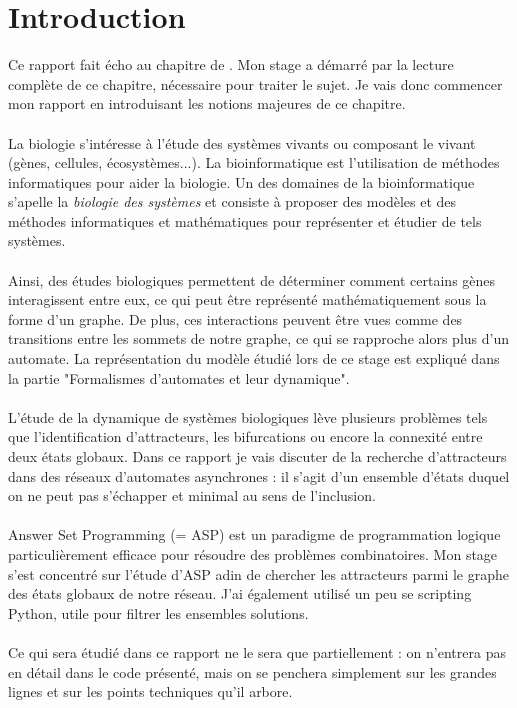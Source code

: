 \documentclass[12pt,a4paper]{article}
\begin{document}
\section{Introduction}
Ce rapport fait écho au chapitre de \cite{chapitre}. Mon stage a démarré par la lecture complète de ce chapitre, nécessaire pour traiter le sujet.
Je vais donc commencer mon rapport en introduisant les notions majeures de ce chapitre.\\ \\
La biologie s'intéresse à l'étude des systèmes vivants ou composant le vivant (gènes, cellules, écosystèmes...). La bioinformatique est l'utilisation de méthodes informatiques pour aider la biologie. Un des domaines de la 
bioinformatique s'apelle la \emph{biologie des systèmes} et consiste à proposer des modèles et des méthodes informatiques et mathématiques pour représenter et étudier de tels systèmes.\\ \\
Ainsi, des études biologiques permettent de déterminer comment certains gènes interagissent entre eux, ce qui peut être représenté mathématiquement sous la forme d'un graphe. De plus, ces interactions peuvent être vues comme des 
transitions entre les sommets de notre graphe, ce qui se rapproche alors plus d'un automate. La représentation du modèle étudié lors de ce stage est expliqué dans la partie "Formalismes d'automates et leur dynamique".\\ \\
L'étude de la dynamique de systèmes biologiques lève plusieurs problèmes tels que l'identification d'attracteurs, les bifurcations ou encore la connexité entre deux états globaux. Dans ce rapport je vais discuter de la recherche 
d'attracteurs dans des réseaux d'automates asynchrones : il s'agit d'un ensemble d'états duquel on ne peut pas s'échapper et minimal au sens de l'inclusion.\\ \\
Answer Set Programming (= ASP) est un paradigme de programmation logique particulièrement efficace pour résoudre des problèmes combinatoires. Mon stage s'est concentré sur l'étude d'ASP adin de chercher les attracteurs parmi le graphe des états globaux de notre réseau. J'ai également utilisé un peu se scripting Python, utile pour filtrer les ensembles solutions.\\ \\
Ce qui sera étudié dans ce rapport ne le sera que partiellement : on n'entrera pas en détail dans le code présenté, mais on se penchera simplement sur les grandes lignes et sur les points techniques qu'il arbore.
\end{document}
